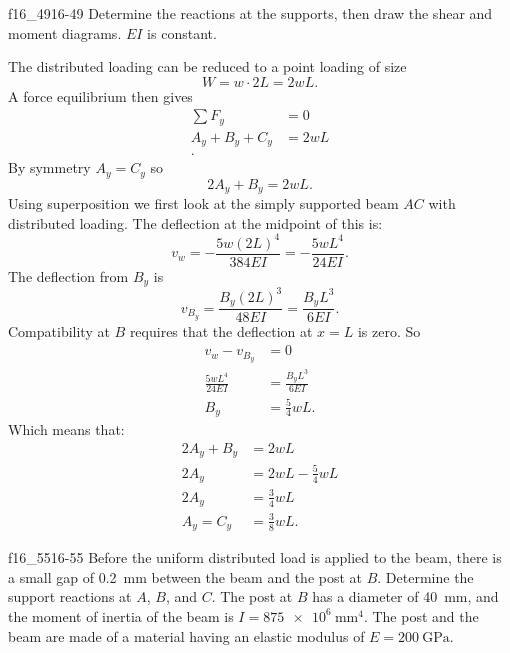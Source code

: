
\begin{problemwithimage}{f16_49}{16-49}
  Determine the reactions at the supports, then draw the shear and moment diagrams.
  $EI$ is constant.
\end{problemwithimage}

\begin{derivation}
  The distributed loading can be reduced to a point loading of size
  \begin{equation*}
    W = w \cdot 2L = 2 wL
  .\end{equation*}
  A force equilibrium then gives
  \begin{align*}
    \sum F_y &= 0 \\
    A_y + B_y + C_y &= 2 wL \\
  .\end{align*}
  By symmetry $A_y = C_y$ so
  \begin{equation*}
    2A_y + B_y = 2 wL
  .\end{equation*}
  Using superposition we first look at the simply supported beam $AC$ with distributed loading.
  The deflection at the midpoint of this is:
  \begin{equation*}
    v_{w} = - \frac{5 w (2L)^{4}}{384 EI} = - \frac{5w L^{4}}{24EI}
  .\end{equation*}
  The deflection from $B_y$ is
  \begin{equation*}
    v_{B_y} = \frac{B_y (2L)^3}{48EI} = \frac{B_y L^3}{6EI}
  .\end{equation*}
  Compatibility at $B$ requires that the deflection at $x = L$ is zero.
  So
  \begin{align*}
    v_w - v_{B_y} &= 0 \\
    \frac{5 wL^{4}}{24EI} &= \frac{B_y L^3}{6EI} \\
    B_y &= \frac{5}{4} w L
  .\end{align*}
  Which means that:
  \begin{align*}
    2A_y + B_y &= 2wL \\
    2A_y &= 2 wL - \frac{5}{4} wL \\
    2A_y &= \frac{3}{4}wL \\
    A_y = C_y &= \frac{3}{8}w L
  .\end{align*}
\end{derivation}

\newpage

\begin{problemwithimage}{f16_55}{16-55}
  Before the uniform distributed load is applied to the beam, there is a small gap of \qty{0,2}{\mm} between the beam and the post at $B$.
  Determine the support reactions at $A$, $B$, and $C$.
  The post at $B$ has a diameter of \qty{40}{\mm}, and the moment of inertia of the beam is $I = \qty{875e6}{\mm^{4}}$.
  The post and the beam are made of a material having an elastic modulus of $E = \qty{200}{\GPa}$.
\end{problemwithimage}

